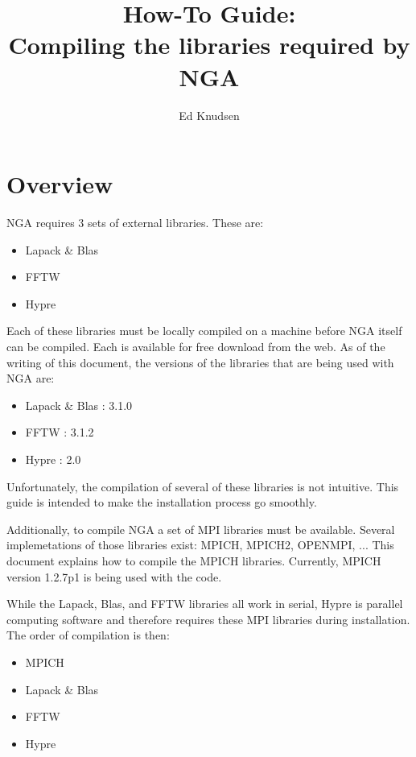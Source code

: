 \documentclass[10pt, oneside, onecolumn]{article}
\begin{document}
  \title{How-To Guide: \\
    Compiling the libraries required by NGA}
  \author{Ed Knudsen} 
  \maketitle
  \section{Overview}
  NGA requires 3 sets of external libraries.  These are:
  \begin{itemize}
    \item{Lapack \& Blas} 
    \item{FFTW}
    \item{Hypre}
  \end{itemize}
  Each of these libraries must be locally compiled on a machine before 
  NGA itself can be compiled.  Each is available for free download from the 
  web. As of the writing of this document, the versions of the libraries
  that are being used with NGA are:
  \begin{itemize}
    \item{Lapack \& Blas : 3.1.0} 
    \item{FFTW : 3.1.2}
    \item{Hypre : 2.0}
  \end{itemize}
  Unfortunately, the compilation of several of these libraries is not 
  intuitive.  This guide is intended to make the installation process
  go smoothly.   
  
  Additionally, to compile NGA a set of MPI libraries 
  must be available. Several implemetations of those libraries exist:
  MPICH, MPICH2, OPENMPI, ... This document explains how to compile the
  MPICH libraries. Currently, MPICH version 1.2.7p1 is being used with
  the code.
  
  While the Lapack, Blas, and FFTW libraries all work in serial, 
  Hypre is parallel computing software and therefore requires these
  MPI libraries during installation. The order of compilation is then:
  \begin{itemize}
    \item MPICH 
    \item Lapack \& Blas
    \item FFTW
    \item Hypre
  \end{itemize}
  
\end{document}
